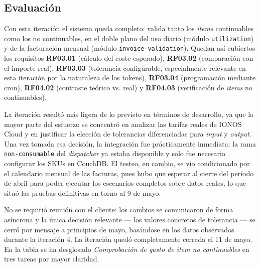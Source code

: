 \subsection{Evaluación}

Con esta iteración el sistema queda completo: valida tanto los \textit{items} continuables como los no continuables, en el doble plano del uso diario (módulo \texttt{utilization}) y de la facturación mensual (módulo \texttt{invoice-validation}). Quedan así cubiertos los requisitos \textbf{RF03.01} (cálculo del coste esperado), \textbf{RF03.02} (comparación con el importe real), \textbf{RF03.03} (tolerancia configurable, especialmente relevante en esta iteración por la naturaleza de los tokens), \textbf{RF03.04} (programación mediante cron), \textbf{RF04.02} (contraste teórico vs. real) y \textbf{RF04.03} (verificación de \textit{items} no continuables).

La iteración resultó más ligera de lo previsto en términos de desarrollo, ya que la mayor parte del esfuerzo se concentró en analizar las tarifas reales de IONOS Cloud y en justificar la elección de tolerancias diferenciadas para \textit{input} y \textit{output}. Una vez tomada esa decisión, la integración fue prácticamente inmediata: la rama \texttt{non-consumable} del \textit{dispatcher} ya estaba disponible y solo fue necesario configurar los SKUs en CouchDB. El testeo, en cambio, se vio condicionado por el calendario mensual de las facturas, pues hubo que esperar al cierre del período de abril para poder ejecutar los escenarios completos sobre datos reales, lo que situó las pruebas definitivas en torno al 9 de mayo.

No se requirió reunión con el cliente: los cambios se comunicaron de forma asíncrona y la única decisión relevante --- los valores concretos de tolerancia --- se cerró por mensaje a principios de mayo, basándose en los datos observados durante la iteración 4. La iteración quedó completamente cerrada el 11 de mayo. En la tabla se ha desglosado \textit{Comprobación de gasto de item no continuables} en tres tareas por mayor claridad. 


